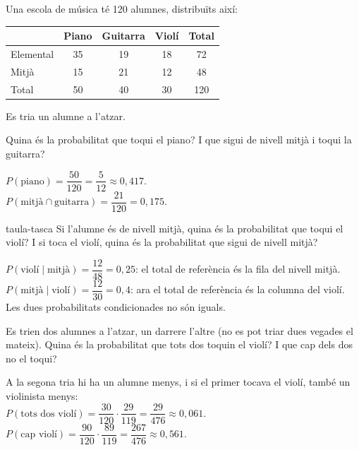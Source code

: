 Una escola de música té 120 alumnes, distribuïts així:
\begin{center}
\begin{tabular}{l|ccc|c}
 & Piano & Guitarra & Violí & Total\\ \hline
Elemental & 35 & 19 & 18 & 72\\
Mitjà & 15 & 21 & 12 & 48\\ \hline
Total & 50 & 40 & 30 & 120
\end{tabular}
\end{center}
Es tria un alumne a l'atzar.

\begin{apartats}

Quina és la probabilitat que toqui el piano? I que sigui de nivell mitjà i toqui la guitarra?

\begin{solucio}
$P(\text{piano})=\dfrac{50}{120}=\dfrac5{12}\approx0{,}417$.\\
$P(\text{mitjà}\cap\text{guitarra})=\dfrac{21}{120}=0{,}175$.
\end{solucio}

\begin{tria}{taula-tasca}
Si l'alumne és de nivell mitjà, quina és la probabilitat que toqui el violí? I si toca el violí, quina
és la probabilitat que sigui de nivell mitjà?

\begin{solucio}
$P(\text{violí}\mid\text{mitjà})=\dfrac{12}{48}=0{,}25$: el total de referència és la fila del nivell
mitjà.\\
$P(\text{mitjà}\mid\text{violí})=\dfrac{12}{30}=0{,}4$: ara el total de referència és la columna del
violí. Les dues probabilitats condicionades no són iguals.
\end{solucio}

Es trien dos alumnes a l'atzar, un darrere l'altre (no es pot triar dues vegades el mateix). Quina és la
probabilitat que tots dos toquin el violí? I que cap dels dos no el toqui?

\begin{solucio}
A la segona tria hi ha un alumne menys, i si el primer tocava el violí, també un violinista menys:\\
$P(\text{tots dos violí})=\dfrac{30}{120}\cdot\dfrac{29}{119}=\dfrac{29}{476}\approx0{,}061$.\\
$P(\text{cap violí})=\dfrac{90}{120}\cdot\dfrac{89}{119}=\dfrac{267}{476}\approx0{,}561$.
\end{solucio}
\end{tria}


\end{apartats}

